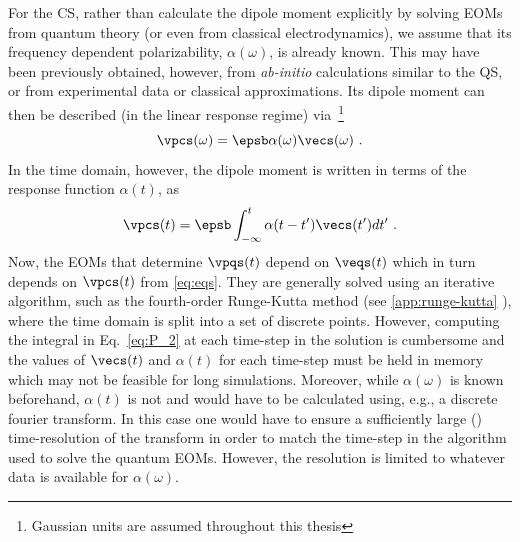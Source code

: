 For the CS, rather than calculate the dipole moment explicitly by solving EOMs
from quantum theory (or even from classical electrodynamics), we assume that
its frequency dependent polarizability, $\alpha(\omega)$, is already known.
This may have been previously obtained, however, from \textit{ab-initio}
calculations similar to the QS, or from experimental data or classical
approximations.  Its dipole moment can then be described (in the linear
response regime) via~\footnote{Gaussian units are assumed throughout this
    thesis }
%
\begin{equation}
    \vpcs(\omega) = \epsb  \alpha(\omega)\vecs(\omega) \ .
    \label{eq:pcs_omega}
\end{equation}
%
In the time domain, however, the dipole moment
is written in terms of the response function $\alpha(t)$, as
%
\begin{equation}
    \vpcs(t) = \epsb \int_{-\infty}^{t}\alpha(t-t')\vecs(t')dt' \ .
    \label{eq:P_2}
\end{equation}
%
Now, the EOMs that determine $\vpqs(t)$ depend on $\veqs(t)$ which in turn
depends on $\vpcs(t)$ from \cref{eq:eqs}. They are generally solved
using an iterative algorithm, such as the fourth-order Runge-Kutta method (see
\cref{app:runge-kutta} ), where the time domain is split into a set of discrete points.
However, computing the integral in Eq.~\eqref{eq:P_2} at each time-step in the
solution is cumbersome and the values of $\vecs(t)$ and $\alpha(t)$ for each
time-step must be held in memory which may not be feasible for long
simulations.  Moreover, while $\alpha(\omega)$ is known beforehand, $\alpha(t)$
is not and would have to be calculated using, e.g., a discrete fourier
transform. In this case one would have to ensure a sufficiently large
() time-resolution of the transform in order to match the
time-step in the algorithm used to solve the quantum EOMs. However, the
resolution is limited to whatever data is available for $\alpha(\omega)$.

